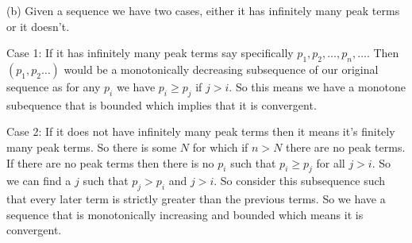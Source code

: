 \documentclass[a4paper]{report}
\begin{document}
(b) Given a sequence we have two cases, either it has infinitely many peak terms or it doesn't. 
\vspace{1em}

Case 1: If it has infinitely many peak terms say specifically $p_{1}, p_{2}, \dots, p_n, \dots$. Then $(p_{1}, p_{2} \dots)$ would be a monotonically decreasing subsequence of our original sequence as for any $p_i$ we have $p_i \ge p_j$ if $j > i$. So this means we have a monotone subequence that is bounded which implies that it is convergent.

\vspace{1em}

Case 2: If it does not have infinitely many peak terms  then it means it's finitely many peak terms. So there is some $N$ for which if $n > N$ there are no peak terms. If there are no peak terms then there is no $p_i$ such that $p_i \ge p_j$ for all  $j > i$.  So we can find a $j$ such that $p_j > p_i$ and $j > i$. So consider this subsequence such that every later term is strictly greater than the previous terms. So we have a sequence that is monotonically increasing and bounded which means it is convergent.
\end{document}
